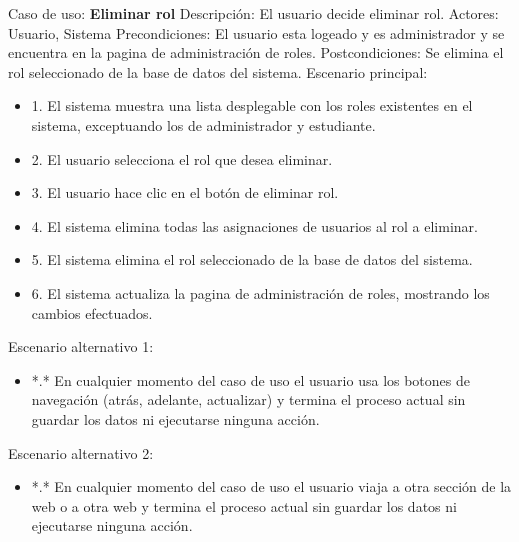 Caso de uso: \textbf{Eliminar rol}
\newline
Descripción: El usuario decide eliminar rol.
\newline
Actores: Usuario, Sistema
\newline
Precondiciones: El usuario esta logeado y es administrador y se encuentra en la pagina de administración de roles.
\newline
Postcondiciones: Se elimina el rol seleccionado de la base de datos del sistema.
\newline
Escenario principal:
\begin{itemize}
	\item 1. El sistema muestra una lista desplegable con los roles existentes en el sistema, exceptuando los de administrador y estudiante.
	\item 2. El usuario selecciona el rol que desea eliminar.
	\item 3. El usuario hace clic en el botón de eliminar rol.
	\item 4. El sistema elimina todas las asignaciones de usuarios al rol a eliminar.
	\item 5. El sistema elimina el rol seleccionado de la base de datos del sistema.
	\item 6. El sistema actualiza la pagina de administración de roles, mostrando los cambios efectuados.
\end{itemize}
Escenario alternativo 1:
\begin{itemize} 
	\item *.* En cualquier momento del caso de uso el usuario usa los botones de navegación (atrás, adelante, actualizar) y termina el proceso actual sin guardar los datos ni ejecutarse ninguna acción.
\end{itemize}
Escenario alternativo 2:
\begin{itemize}
	\item *.* En cualquier momento del caso de uso el usuario viaja a otra sección de la web o a otra web y termina el proceso actual sin guardar los datos ni ejecutarse ninguna acción.
\end{itemize}

